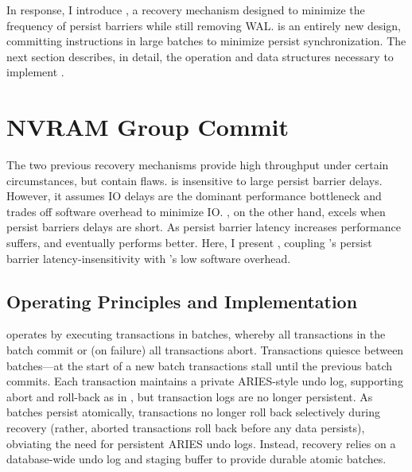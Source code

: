 In response, I introduce \GroupCommit, a recovery mechanism designed to minimize the frequency of persist barriers while still removing WAL.
\GroupCommit is an entirely new design, committing instructions in large batches to minimize persist synchronization.
The next section describes, in detail, the operation and data structures necessary to implement \GroupCommit.

\section{NVRAM Group Commit}
\label{sec:OLTP_design:GroupCommit}

The two previous recovery mechanisms provide high throughput under certain circumstances, but contain flaws.
\NVDisk is insensitive to large persist barrier delays.
However, it assumes IO delays are the dominant performance bottleneck and trades off software overhead to minimize IO.
\InPlace, on the other hand, excels when persist barriers delays are short.
As persist barrier latency increases performance suffers, and \NVDisk eventually performs better.
Here, I present \GroupCommit, coupling \NVDisk's persist barrier latency-insensitivity with \InPlace's low software overhead.

\subsection{Operating Principles and Implementation}
\label{sec:OLTP_design:GroupCommit:Operation}

\GroupCommit operates by executing transactions in batches, whereby all transactions in the batch commit or (on failure) all transactions abort.
Transactions quiesce between batches---at the start of a new batch transactions stall until the previous batch commits.
Each transaction maintains a private ARIES-style undo log, supporting abort and roll-back as in \InPlace, but transaction logs are no longer persistent.
As batches persist atomically, transactions no longer roll back selectively during recovery (rather, aborted transactions roll back before any data persists), obviating the need for persistent ARIES undo logs.
Instead, recovery relies on a database-wide undo log and staging buffer to provide durable atomic batches.

